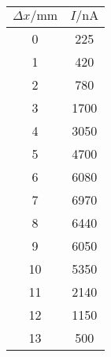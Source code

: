 \label{tab:tabT00}
	\begin{tabular}{S[table-format=2.0]S[table-format=4.0]}
		\toprule
		{$\Delta x/ \si{\milli\meter}$} & {$ I / \si{\nano\ampere}$} \\
		 &  225 \\
		 1 &  420 \\
		 2 &  780 \\
		 3 & 1700 \\
		 4 & 3050 \\
		 5 & 4700 \\
		 6 & 6080 \\
		 7 & 6970 \\
		 8 & 6440 \\
		 9 & 6050 \\
		10 & 5350 \\
		11 & 2140 \\
		12 & 1150 \\
		13 &  500 \\
		\bottomrule
	\end{tabular}
